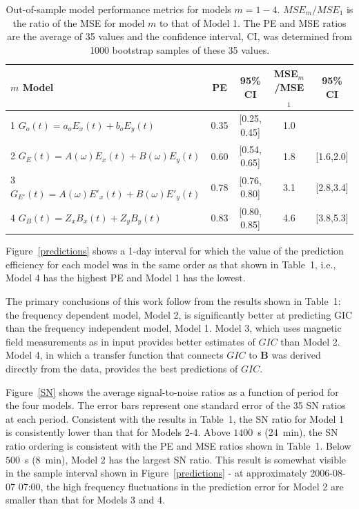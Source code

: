 \documentclass[draft,linenumbers]{agujournal2018}
\begin{document}
\begin{table}
\caption{Out-of-sample model performance metrics for models $m=1-4$. $MSE_m/MSE_1$ is the ratio of the MSE for model $m$ to that of Model 1. The PE and MSE ratios are the average of 35 values and the confidence interval, CI, was determined from 1000 bootstrap samples of these 35 values.}
\centering
\begin{tabular}{l c c c c}
\hline
$m$\hspace{1em} Model & PE & 95\% CI & MSE$_m$/MSE$_1$ & 95\% CI\\
\hline
1\hspace{1em} $G_o(t) = a_oE_x(t) + b_oE_y(t)$ & 0.35 & [0.25, 0.45] & 1.0 & \\
2\hspace{1em} $G_E(t) = A(\omega)E_x(t) + B(\omega)E_y(t)$ & 0.60 & [0.54, 0.65] & 1.8 & [1.6,2.0]\\
3\hspace{1em} $G_{E'}(t) = A(\omega)E'_x(t) + B(\omega)E'_y(t)$ & 0.78 & [0.76, 0.80] & 3.1 & [2.8,3.4]\\
4\hspace{1em} $G_{B}(t) = Z_xB_x(t) + Z_yB_y(t)$ & 0.83 & [0.80, 0.85] & 4.6 & [3.8,5.3]\\
\hline
\end{tabular}
\end{table}

Figure~\ref{predictions} shows a 1-day interval for which the value of the prediction efficiency for each model was in the same order as that shown in Table~1, i.e., Model 4 has the highest PE and Model 1 has the lowest.

The primary conclusions of this work follow from the results shown in Table~1: the frequency dependent model, Model 2, is significantly better at predicting GIC than the frequency independent model, Model 1. Model 3, which uses magnetic field measurements as in input provides better estimates of $GIC$ than Model 2. Model 4, in which a transfer function that connects $GIC$ to $\mathbf{B}$ was derived directly from the data, provides the best predictions of $GIC$.

Figure~\ref{SN} shows the average signal-to-noise ratios as a function of period for the four models. The error bars represent one standard error of the 35 SN ratios at each period. Consistent with the results in Table~1, the SN ratio for Model 1 is consistently lower than that for Models 2-4.  Above $1400$~s (24~min), the SN ratio ordering is consistent with the PE and MSE ratios shown in Table~1. Below $500$~s (8~min), Model 2 has the largest SN ratio. This result is somewhat visible in the sample interval shown in Figure~\ref{predictions} - at approximately 2006-08-07 07:00, the high frequency fluctuations in the prediction error for Model 2 are smaller than that for Models 3 and 4.
\end{document}
